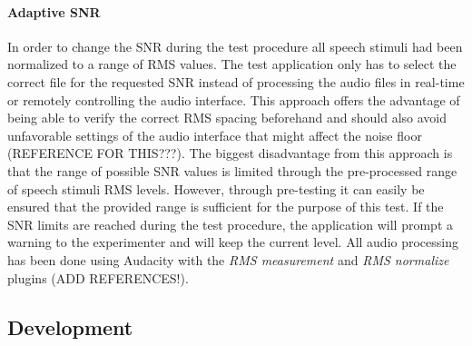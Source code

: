 \documentclass[a4paper,11pt]{article}%
\renewcommand{\\}{\vspace*{0.5\baselineskip} \newline}
\begin{document}
\paragraph{Adaptive SNR} In order to change the \ac{SNR} during the test procedure all speech stimuli had been normalized to a range of \ac{RMS} values. The test application only has to select the correct file for the requested \ac{SNR} instead of processing the audio files in real-time or remotely controlling the audio interface. This approach offers the advantage of being able to verify the correct \ac{RMS} spacing beforehand and should also avoid unfavorable settings of the audio interface that might affect the noise floor (REFERENCE FOR THIS???). The biggest disadvantage from this approach is that the range of possible \ac{SNR} values is limited through the pre-processed range of speech stimuli \ac{RMS} levels. However, through pre-testing it can easily be ensured that the provided range is sufficient for the purpose of this test. If the \ac{SNR} limits are reached during the test procedure, the application will prompt a warning to the experimenter and will keep the current level.
\newline
\newline
All audio processing has been done using Audacity with the \textit{\ac{RMS} measurement} and \textit{\ac{RMS} normalize} plugins (ADD REFERENCES!).


\subsection{Development}
\end{document}
